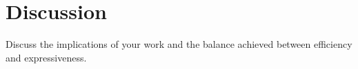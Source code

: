 \section{Discussion}

\begin{outline}
  Discuss the implications of your work and the balance achieved between efficiency and expressiveness.
\end{outline}
